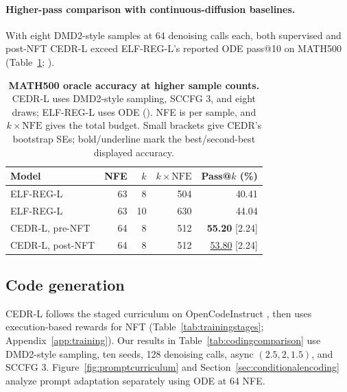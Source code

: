 \documentclass[11pt,letterpaper]{article}
\begin{document}
\paragraph{Higher-pass comparison with continuous-diffusion baselines.}
With eight DMD2-style samples at 64 denoising calls each, both supervised and post-NFT CEDR-L exceed ELF-REG-L's reported ODE pass@10 on MATH500 (Table~\ref{tab:mathhigherpass}; \citealp[v3, Table 20]{scalingdlm}).

\begin{table}[!htbp]
\centering\small
\setlength{\tabcolsep}{8pt}
\caption{\textbf{MATH500 oracle accuracy at higher sample counts.} CEDR-L uses DMD2-style sampling, SCCFG 3, and eight draws; ELF-REG-L uses ODE (\citealp[v3, Table 20]{scalingdlm}). NFE is per sample, and $k\times\mathrm{NFE}$ gives the total budget. Small brackets give CEDR's bootstrap SEs; bold/underline mark the best/second-best displayed accuracy.}
\label{tab:mathhigherpass}
\begin{tabular}{@{}lrrrr@{}}
\toprule
Model & NFE & $k$ & $k\times\mathrm{NFE}$ & Pass@$k$ (\%)\\
\midrule
ELF-REG-L \citep{scalingdlm} & 63 & 8 & 504 & 40.41\\
ELF-REG-L \citep{scalingdlm} & 63 & 10 & 630 & 44.04\\
CEDR-L, pre-NFT & 64 & 8 & 512 & \textbf{55.20} {\scriptsize [2.24]}\\
CEDR-L, post-NFT & 64 & 8 & 512 & \underline{53.80} {\scriptsize [2.24]}\\
\bottomrule
\end{tabular}
\end{table}

\FloatBarrier
\subsection{Code generation}
\label{sec:codingresults}

CEDR-L follows the staged curriculum on OpenCodeInstruct \citep{opencodeinstruct}, then uses execution-based rewards for NFT (Table~\ref{tab:trainingstages}; Appendix~\ref{app:training}). Our results in Table~\ref{tab:codingcomparison} use DMD2-style sampling, ten seeds, 128 denoising calls, async $(2.5,2,1.5)$, and SCCFG 3. Figure~\ref{fig:promptcurriculum} and Section~\ref{sec:conditionalencoding} analyze prompt adaptation separately using ODE at 64 NFE.
\end{document}
